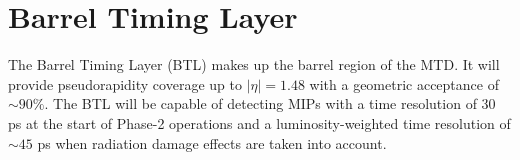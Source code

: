 \section{Barrel Timing Layer}
 The Barrel Timing Layer (BTL) makes up the barrel region of the MTD.  It will provide pseudorapidity coverage up to $|\eta| = 1.48$ with a geometric acceptance of $\sim 90\%$.  The BTL will be capable of detecting MIPs with a time resolution of 30 ps at the start of Phase-2 operations and a luminosity-weighted time resolution of $\sim45$ ps when radiation damage effects are taken into account.



